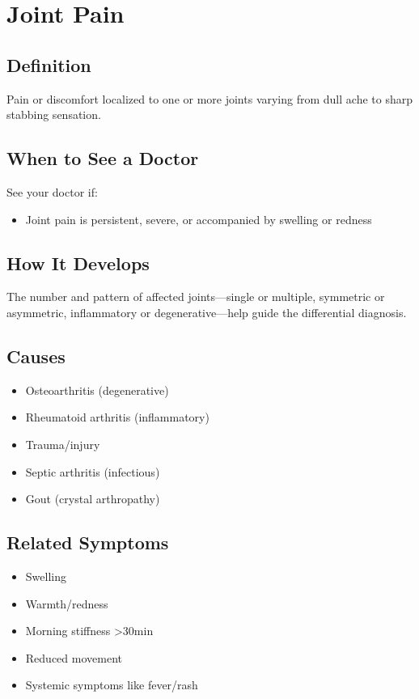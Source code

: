 \chapter{Joint Pain}

\section*{Definition}
Pain or discomfort localized to one or more joints varying from dull ache to sharp stabbing sensation.

\section*{When to See a Doctor}
See your doctor if:
\begin{itemize}
  \item Joint pain is persistent, severe, or accompanied by swelling or redness
\end{itemize}

\section*{How It Develops}
The number and pattern of affected joints—single or multiple, symmetric or asymmetric, inflammatory or degenerative—help guide the differential diagnosis.

\section*{Causes}
\begin{itemize}
  \item Osteoarthritis (degenerative)
  \item Rheumatoid arthritis (inflammatory)
  \item Trauma/injury
  \item Septic arthritis (infectious)
  \item Gout (crystal arthropathy)
\end{itemize}

\section*{Related Symptoms}
\begin{itemize}
  \item Swelling
  \item Warmth/redness
  \item Morning stiffness >30min
  \item Reduced movement
  \item Systemic symptoms like fever/rash
\end{itemize}

